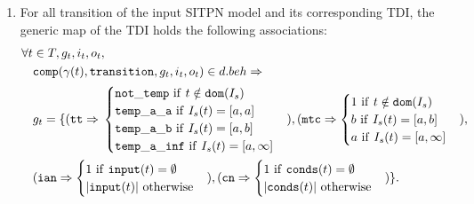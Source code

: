 \begin{definition}
\begin{enumerate}[resume]
  \item For all transition of the input SITPN model and its corresponding TDI, the generic map of the TDI holds the following associations:\\
    \begin{equation*}
      \begin{aligned}[t]
        \forall{}t&\in{}T,g_t,i_t,o_t, \\
                  & \mathtt{comp}(\gamma(t),\mathtt{transition},g_t,i_t,o_t)\in{}d.beh\Rightarrow \\
                  & g_t=\{(\mathtt{tt}\Rightarrow{}
                    \begin{cases}
                      \mathtt{not\_temp}~\mathrm{if}~t\notin{}\mathtt{dom}(I_s) \\
                      \mathtt{temp\_a\_a}~\mathrm{if}~I_s(t)=[a,a] \\
                      \mathtt{temp\_a\_b}~\mathrm{if}~I_s(t)=[a,b] \\
                      \mathtt{temp\_a\_inf}~\mathrm{if}~I_s(t)=[a,\infty] \\
                    \end{cases}),
        (\mathtt{mtc}\Rightarrow
        \begin{cases}
          1~\mathrm{if}~t\notin{}\mathtt{dom}(I_s) \\
          b~\mathrm{if}~I_s(t)=[a,b] \\
          a~\mathrm{if}~I_s(t)=[a,\infty] \\
        \end{cases}), \\
                  & (\mathtt{ian}\Rightarrow
                    \begin{cases}
                      1~\mathrm{if}~\mathtt{input}(t)=\emptyset \\
                      \vert{}\mathtt{input}(t)\vert~\mathrm{otherwise} \\
                    \end{cases}), 
        (\mathtt{cn}\Rightarrow
        \begin{cases}
          1~\mathrm{if}~\mathtt{conds}(t)=\emptyset \\
          \vert{}\mathtt{conds}(t)\vert~\mathrm{otherwise} \\
        \end{cases})\}. \\
      \end{aligned}
    \end{equation*}
    

\end{enumerate}
\end{definition}
